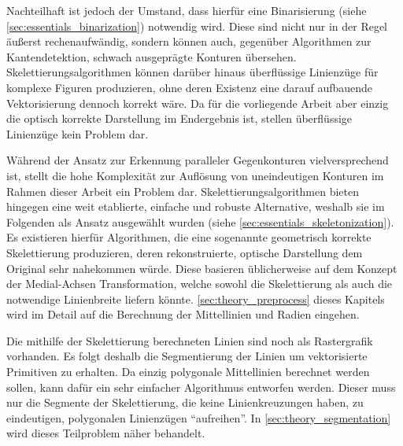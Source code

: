\begin{itemize}
    Nachteilhaft ist jedoch der Umstand, dass hierfür eine Binarisierung (siehe \autoref{sec:essentials_binarization}) notwendig wird.
    Diese sind nicht nur in der Regel äußerst rechenaufwändig, sondern können auch, gegenüber Algorithmen zur Kantendetektion, schwach ausgeprägte Konturen übersehen.
    Skelettierungsalgorithmen können darüber hinaus überflüssige Linienzüge für komplexe Figuren produzieren, ohne deren Existenz eine darauf aufbauende Vektorisierung dennoch korrekt wäre.
    Da für die vorliegende Arbeit aber einzig die optisch korrekte Darstellung im Endergebnis ist, stellen überflüssige Linienzüge kein Problem dar.
\end{itemize}

Während der Ansatz zur Erkennung paralleler Gegenkonturen vielversprechend ist, stellt die hohe Komplexität zur Auflösung von uneindeutigen Konturen im Rahmen dieser Arbeit ein Problem dar.
Skelettierungsalgorithmen bieten hingegen eine weit etablierte, einfache und robuste Alternative, weshalb sie im Folgenden als Ansatz ausgewählt wurden (siehe \autoref{sec:essentials_skeletonization}).
Es existieren hierfür Algorithmen, die eine sogenannte geometrisch korrekte Skelettierung produzieren, deren rekonstruierte, optische Darstellung dem Original sehr nahekommen würde.
Diese basieren üblicherweise auf dem Konzept der Medial-Achsen Transformation, welche sowohl die Skelettierung als auch die notwendige Linienbreite liefern könnte.
\autoref{sec:theory_preprocess} dieses Kapitels wird im Detail auf die Berechnung der Mittellinien und Radien eingehen.

Die mithilfe der Skelettierung berechneten Linien sind noch als Rastergrafik vorhanden.
Es folgt deshalb die Segmentierung der Linien um vektorisierte Primitiven zu erhalten.
Da einzig polygonale Mittellinien berechnet werden sollen, kann dafür ein sehr einfacher Algorithmus entworfen werden.
Dieser muss nur die Segmente der Skelettierung, die keine Linienkreuzungen haben, zu eindeutigen, polygonalen Linienzügen \enquote{aufreihen}.
In \autoref{sec:theory_segmentation} wird dieses Teilproblem näher behandelt.


